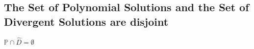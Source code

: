 \documentclass[11pt]{article}
\begin{document}









\subsection{The Set of Polynomial Solutions and the Set of Divergent Solutions are disjoint}
\begin{center}
\vspace{2mm}
$
\mathbb{P} \cap \hat{D} = \emptyset
$
\end{center}
\end{document}
